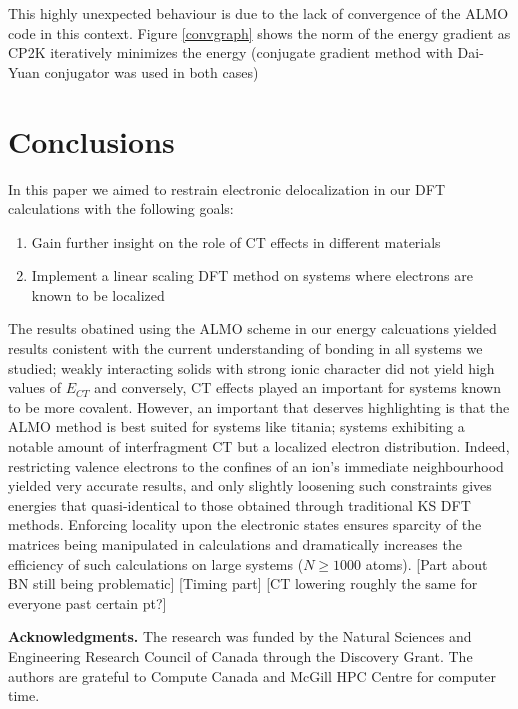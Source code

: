 \documentclass[aps,prb,twocolumn,amsmath,amssymb,superscriptaddress,longbibliography]{revtex4-1}
\begin{document}
This highly unexpected behaviour is due to the lack of convergence of the ALMO code in this context. Figure \ref{convgraph} shows the norm of the energy gradient as CP2K iteratively minimizes the energy (conjugate gradient method with Dai-Yuan conjugator was used in both cases) 

\section{Conclusions} 

In this paper we aimed to restrain electronic delocalization in our DFT calculations with the following goals:
\begin{enumerate}
\item{Gain further insight on the role of CT effects in different materials}
\item{Implement a linear scaling DFT method on systems where electrons are known to be localized}
\end{enumerate}
The results obatined using the ALMO scheme in our energy calcuations yielded results conistent with the current understanding of bonding in all systems we studied; weakly interacting solids with strong ionic character did not yield high values of $E_{CT}$ and conversely, CT effects played an important for systems known to be more covalent.
However, an important that deserves highlighting is that the ALMO method is best suited for systems like titania; systems exhibiting a notable amount of interfragment CT but a localized electron distribution. 
Indeed, restricting valence electrons to the confines of an ion's immediate neighbourhood yielded very accurate results, and only slightly loosening such constraints gives energies that quasi-identical to those obtained through traditional KS DFT methods. 
Enforcing locality upon the electronic states ensures sparcity of the matrices being manipulated in calculations and dramatically increases the efficiency of such calculations on large systems ($N\geq 1000$ atoms).
[Part about BN still being problematic]
[Timing part]
[CT lowering roughly the same for everyone past certain pt?]



\textbf{Acknowledgments.} The research was funded by the Natural Sciences and Engineering Research Council of Canada through the Discovery Grant. The authors are grateful to Compute Canada and McGill HPC Centre for computer time.


%
%
\end{document}
